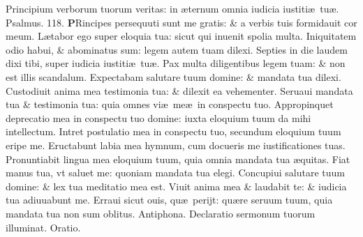 \documentclass[a5paper,10pt]{book}
\def\ae{æ}
\begin{document}
\begin{multicols*}{2}
\newline \color{red} P\color{black}rincipium verborum tuorum veritas: in \ae ternum omnia iudicia iustiti\ae \ tu\ae . \quad \color{red} Psalmus. \hypertarget{ps118.11}{118.} \color{black}
\vspace{-.5em}
\lettrine[lines=2]{\bfseries \color{red} P}{}Rincipes persequuti sunt me gratis: \& a verbis tuis formidauit cor meum.%
\newline \color{red} L\color{black}\ae tabor ego super eloquia tua: sicut qui inuenit spolia multa.
\newline \color{red} I\color{black}niquitatem odio habui, \& abominatus sum: legem autem tuam dilexi.
\newline \color{red} S\color{black}epties in die laudem dixi tibi, super iudicia iustiti\ae \ tu\ae .
\newline \color{red} P\color{black}ax multa diligentibus legem tuam: \& non est illis scandalum.
\newline \color{red} E\color{black}xpectabam salutare tuum domine: \& mandata tua dilexi.
\newline \color{red} C\color{black}ustodiuit anima mea testimonia tua: \& dilexit ea vehementer.
\newline \color{red} S\color{black}eruaui mandata tua \& testimonia tua: quia omnes vi\ae \ me\ae \ in conspectu tuo.
\newline \color{red} A\color{black}ppropinquet deprecatio mea in conspectu tuo domine: iuxta eloquium tuum da mihi intellectum.
\newline \color{red} I\color{black}ntret postulatio mea in conspectu tuo, secundum eloquium tuum eripe me.
\newline \color{red} E\color{black}ructabunt labia mea hymnum, cum docueris me iustificationes tuas.
\newline \color{red} P\color{black}ronuntiabit lingua mea eloquium tuum, quia omnia mandata tua \ae quitas.
\newline \color{red} F\color{black}iat manus tua, vt saluet me: quoniam mandata tua elegi.
\newline \color{red} C\color{black}oncupiui salutare tuum domine: \& lex tua meditatio mea est.
\newline \color{red} V\color{black}iuit anima mea \& laudabit te: \& iudicia tua adiuuabunt me.
\newline \color{red} E\color{black}rraui sicut ouis, qu\ae \ perijt: qu\ae re seruum tuum, quia mandata tua non sum oblitus.
\newline \color{red} Antiphona. \color{black} Declaratio sermonum tuorum illuminat. \color{red} Oratio. \color{black}

\end{multicols*}
\end{document}
